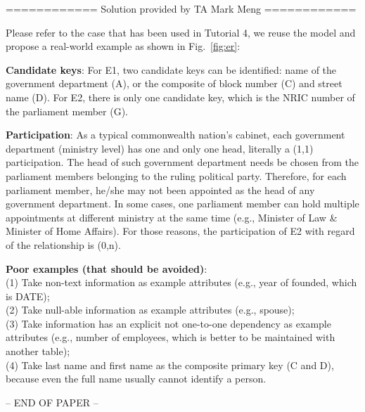 \documentclass[10pt,a4paper,answers]{exam}
\begin{document}
\begin{questions}
\begin{parts}
\begin{solution}
\begin{center}
	============ Solution provided by TA Mark Meng ============
\end{center}\vspace{5pt}

Please refer to the case that has been used in Tutorial 4, we reuse the model and propose a real-world example as shown in Fig.~\ref{fig:er}:	
\vspace{5pt}

\textbf{Candidate keys}: For E1, two candidate keys can be identified: name of the government department (A), or the composite of block number (C) and street name (D).
For E2, there is only one candidate key, which is the NRIC number of the parliament member (G).

\textbf{Participation}: As a typical commonwealth nation's cabinet, each government department (ministry level) has one and only one head, literally a (1,1) participation. The head of such government department needs be chosen from the parliament members belonging to the ruling political party. Therefore, for each parliament member, he/she may not been appointed as the head of any government department. In some cases, one parliament member can hold multiple appointments at different ministry at the same time (e.g., Minister of Law \& Minister of Home Affairs). For those reasons, the participation of E2 with regard of the relationship is (0,n).

\vspace{5pt}
\textbf{Poor examples (that should be avoided)}: \\
(1) Take non-text information as example attributes (e.g., year of founded, which is DATE);\\
(2) Take null-able information as example attributes (e.g., spouse);\\
(3) Take information has an explicit not one-to-one dependency as example attributes (e.g., number of employees, which is better to be maintained with another table);\\
(4) Take last name and first name as the composite primary key (C and D), because even the full name usually cannot identify a person.

\end{solution}
\end{parts}
\end{questions}

\begin{center}-- END OF PAPER --\end{center}
\end{document}
